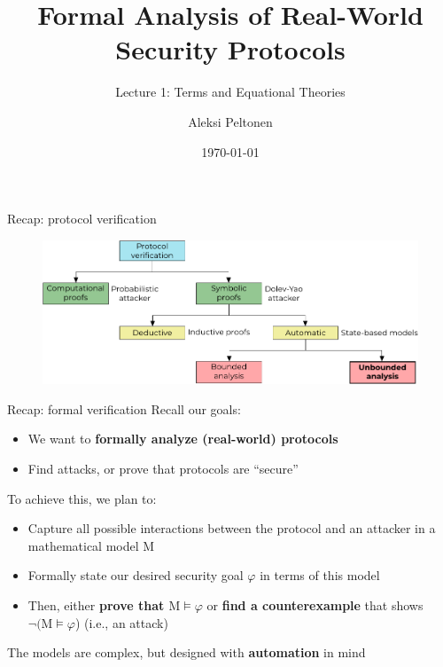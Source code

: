 \documentclass[11pt,aspectratio=169]{beamer}
\title{Formal Analysis of Real-World Security Protocols}
\subtitle{Lecture 1: Terms and Equational Theories}
\date{\today}
\author{Aleksi Peltonen}
\institute{CISPA Helmholtz Center for Information Security}
\begin{document}
\maketitle


\begin{frame}[fragile]{Recap: protocol verification}
    \begin{figure}
        \centering
        \includegraphics[width=\textwidth]
            {figures/lecture_1/protocol_verification}
    \end{figure}
\end{frame}

\begin{frame}[fragile]{Recap: formal verification}
    Recall our goals:
    \begin{itemize}
        \item We want to \textbf{formally analyze (real-world) protocols}
        \item Find attacks, or prove that protocols are ``secure''
    \end{itemize}
    To achieve this, we plan to:
    \begin{itemize}
        \item Capture all possible interactions between the protocol and an 
              attacker in a mathematical model $\mathrm{M}$
        \item Formally state our desired security goal $\varphi$ in terms of 
              this model
        \item Then, either \textbf{prove that $\mathrm{M} \vDash \varphi$} or 
              \textbf{find a counterexample} that shows
              $\neg (\mathrm{M} \vDash \varphi$) (i.e., an attack)
    \end{itemize}
    The models are complex, but designed with \textbf{automation} in mind
\end{frame}
\end{document}
